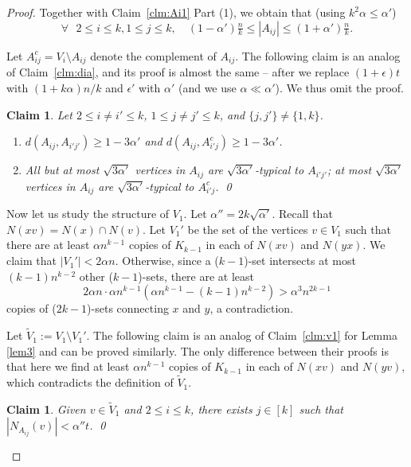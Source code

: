 \documentclass[reqno]{amsart}
\theoremstyle{plain}
\newtheorem{claim}[theorem]{Claim}
\def\a{\alpha}
\def\eps{\epsilon}
\def\sqa{\sqrt{3\alpha'}}
\begin{document}
\begin{proof}
Together with Claim~\ref{clm:Ai1} Part (1),  we obtain that (using $k^2 \a\le \a'$)
\begin{equation}
\label{eq:2size}
\forall \text{ } 2\le i \le k, 1\le j\le k, \quad (1- \alpha')\tfrac nk \le |A_{ij}| \le (1+ \alpha') \tfrac{n}{k}.
\end{equation}

Let $A_{ij}^c = V_i \setminus A_{ij}$ denote the complement of $A_{ij}$. The following claim is an analog of Claim~\ref{clm:dia}, and its proof is almost the same -- after we replace $(1+\eps)t$ with $(1+ k\a)n/k$ and $\eps'$ with $\a'$ (and we use $\a \ll \a'$). We thus omit the proof.

\begin{claim}\label{clm:2dia}
Let $2\le i\neq i '\le k$, $1\le j\neq j'\le k$, and $\{j, j'\} \ne \{1, k\}$.
\begin{enumerate}
\item $d(A_{ij}, A_{i'j'}) \ge 1 - 3\alpha'$ and $d(A_{ij}, A_{i'j}^c) \ge 1 - 3\alpha'$.
\item All but at most $\sqa$ vertices in $A_{ij}$ are $\sqa$-typical to $A_{i'j'}$; at most $\sqa$ vertices in $A_{ij}$ are $\sqa$-typical to $A^c_{i'j}$. \qed
\end{enumerate}
\end{claim}


Now let us study the structure of $V_1$. Let $\alpha''=2k \sqrt{\alpha'}$. Recall that $N(xv)=N(x)\cap N(v)$. Let $V_1'$ be the set of the vertices $v\in V_1$ such that there are at least $\a n^{k-1}$ copies of $K_{k-1}$ in each of $N(xv)$ and $N(yx)$. We claim that $|V_1'| < 2\a n$. Otherwise, since a ($k-1$)-set intersects at most $(k-1)n^{k-2}$ other ($k-1$)-sets, there are at least
\[
2\a n\cdot \a n^{k-1} (\a n^{k-1} - (k-1)n^{k-2})  > \a^3 n^{2k-1}
\]
copies of ($2k-1$)-sets connecting $x$ and $y$, a contradiction. %

Let $\tilde{V}_1 := V_1\setminus V_1'$. The following claim is an analog of Claim~\ref{clm:v1} for Lemma \ref{lem3} and can be proved similarly. The only difference between their proofs is that here we find at least $\a n^{k-1}$ copies of $K_{k-1}$ in each of $N(xv)$ and $N(yv)$, which contradicts the definition of $\tilde V_1$.
\begin{claim}\label{clm:2v1}
Given $v\in \tilde V_1$ and $2\le i \le k$, there exists $j\in [k]$ such that $|N_{A_{ij}}(v)|<\a'' t$. \qed
\end{claim}


\end{proof}
\end{document}
